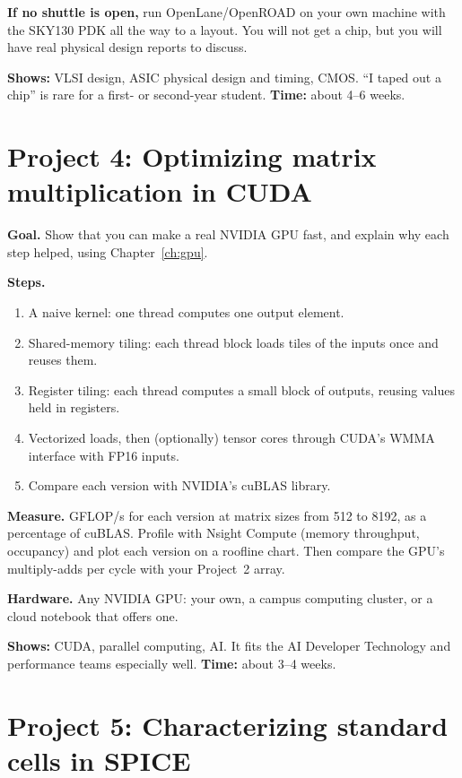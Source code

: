 \textbf{If no shuttle is open,} run OpenLane/OpenROAD on your own machine with the SKY130 PDK all the way to a layout. You will not get a chip, but you will have real physical design reports to discuss.

\textbf{Shows:} VLSI design, ASIC physical design and timing, CMOS. ``I taped out a chip'' is rare for a first- or second-year student. \textbf{Time:} about 4--6 weeks.

\section{Project 4: Optimizing matrix multiplication in CUDA}

\textbf{Goal.} Show that you can make a real NVIDIA GPU fast, and explain why each step helped, using Chapter~\ref{ch:gpu}.

\textbf{Steps.}
\begin{enumerate}
  \item A naive kernel: one thread computes one output element.
  \item Shared-memory tiling: each thread block loads tiles of the inputs once and reuses them.
  \item Register tiling: each thread computes a small block of outputs, reusing values held in registers.
  \item Vectorized loads, then (optionally) tensor cores through CUDA's WMMA interface with FP16 inputs.
  \item Compare each version with NVIDIA's cuBLAS library.
\end{enumerate}

\textbf{Measure.} GFLOP/s for each version at matrix sizes from 512 to 8192, as a percentage of cuBLAS. Profile with Nsight Compute (memory throughput, occupancy) and plot each version on a roofline chart. Then compare the GPU's multiply-adds per cycle with your Project~2 array.

\textbf{Hardware.} Any NVIDIA GPU: your own, a campus computing cluster, or a cloud notebook that offers one.

\textbf{Shows:} CUDA, parallel computing, AI. It fits the AI Developer Technology and performance teams especially well. \textbf{Time:} about 3--4 weeks.

\section{Project 5: Characterizing standard cells in SPICE}

